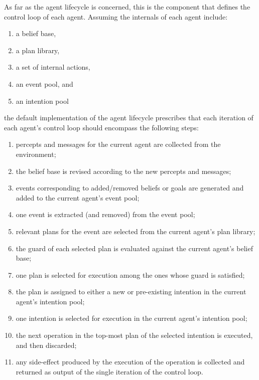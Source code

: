 As far as the agent lifecycle is concerned,
this is the component that defines the control loop of each agent.
%
Assuming the internals of each agent include:
%
\begin{enumerate}
    \item a belief base,
    \item a plan library,
    \item a set of internal actions,
    \item an event pool,
    and
    \item an intention pool
\end{enumerate}
%
the default implementation of the agent lifecycle prescribes that
each iteration of each agent's control loop should encompass the following steps:
%
\begin{enumerate}
    \item percepts and messages for the current agent are collected from the environment;
    \item \label{lifecycle:bb-revision}
    the belief base is revised according to the new percepts and messages;
    \item events corresponding to added/removed beliefs or goals are generated and added to the current agent's event pool;
    \item \label{lifecycle:event-selection}
    one event is extracted (and removed) from the event pool;
    \item \label{lifecycle:plan-selection}
    relevant plans for the event are selected from the current agent's plan library;
    \item the guard of each selected plan is evaluated against the current agent's belief base;
    \item \label{lifecycle:applicable-plan-selection}
    one plan is selected for execution among the ones whose guard is satisfied;
    \item the plan is assigned to either a new or pre-existing intention in the current agent's intention pool;
    \item \label{lifecycle:intention-selection}
    one intention is selected for execution in the current agent's intention pool;
    \item \label{lifecycle:actuation}
    the next operation in the top-most plan of the selected intention is executed, and then discarded;
    \item any side-effect produced by the execution of the operation is collected and returned as output of the single iteration of the control loop.
\end{enumerate}

